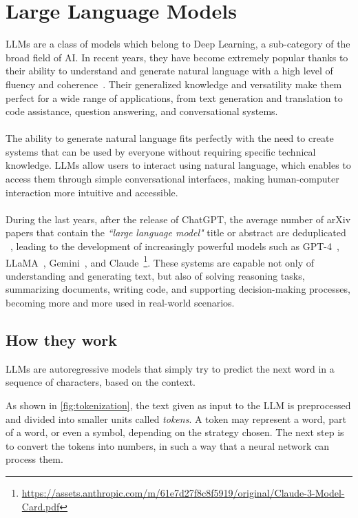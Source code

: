 \documentclass[12pt,a4paper,openright,twoside]{book}
\begin{document}
\section{Large Language Models}
\acp{LLM} are a class of models which belong to Deep Learning,
a sub-category of the broad field of \ac{AI}. 
In recent years, they have become extremely popular thanks to their ability to understand and generate natural language with a high level of fluency and coherence~\cite{zhao2026surveylargelanguagemodels}. 
Their generalized knowledge and versatility make them perfect for a wide range of applications,
from text generation and translation to code assistance,
question answering,
and conversational systems.
\\\\
The ability to generate natural language fits perfectly with the need to create systems that can be used by everyone without requiring specific technical knowledge.
%
\acp{LLM} allow users to interact using natural language,
which enables to access them through simple conversational interfaces, making human-computer interaction more intuitive and accessible.
\\\\
During the last years, after the release of ChatGPT, the average number of arXiv papers that contain the \textit{``large language model"} title or abstract are deduplicated ~\cite{zhao2026surveylargelanguagemodels}, leading to the development of increasingly powerful models such as GPT-4~\cite{openai2023_techreport}, LLaMA~\cite{llama2_foundation}, Gemini~\cite{gemini2025}, and Claude~\footnote{\url{https://assets.anthropic.com/m/61e7d27f8c8f5919/original/Claude-3-Model-Card.pdf}}. 
These systems are capable not only of understanding and generating text, but also of solving reasoning tasks, summarizing documents, writing code, and supporting decision-making processes, becoming more and more used in real-world scenarios.
\subsection{How they work}
\acp{LLM} are autoregressive models that simply try to predict the next word in a sequence of characters,
based on the context.

As shown in \cref{fig:tokenization}, the text given as input to the \ac{LLM} is preprocessed and divided into smaller units called \textit{tokens}.
A token may represent a word, part of a word, or even a symbol, depending on the strategy chosen.
%
The next step is to convert the tokens into numbers, in such a way that a neural network can process them.
\end{document}
